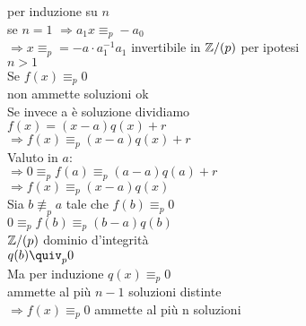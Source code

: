\documentclass[12px]{article}
\begin{document}
   \begin{dimo}
   	per induzione su $n$ \\
	se $n = 1$  $ \Rightarrow a_1x\equiv_p -a_0$ \\
	$ \Rightarrow x \equiv_p = -a\cdot a_1^{-1}$\hfill $a_1$ invertibile in $\mathbb{Z}/(p)$ per ipotesi \\
	$n > 1$ \\
	Se $f(x) \equiv_p 0$\\
	non ammette soluzioni ok \\
	Se invece a è soluzione dividiamo\\
	$f(x) = (x - a ) q(x) + r$\\
	 $ \Rightarrow f(x)\equiv_p (x-a)q(x) + r$ \\
	 Valuto in $a$:\\
	 $ \Rightarrow 0\equiv_p f(a) \equiv_p (a-a)q(a) + r$ \\
	 $ \Rightarrow f(x) \equiv_p (x - a)q(x)$\\
	 Sia  $b\not \equiv_p a$ tale che  $f(b)\equiv_p 0$\\
	  $0\equiv_p f(b) \equiv_p (b-a)q(b)$\\
	  $\mathbb{Z}/(p)$ dominio d'integrità\\
	  $q(b)\quiv_p 0$\\
	  Ma per induzione  $q(x)\equiv_p 0$\\
	  ammette al più  $n-1$ soluzioni distinte\\
	  $ \Rightarrow  f(x)\equiv_p 0$ ammette al più n soluzioni 

   \end{dimo}
\end{document}
